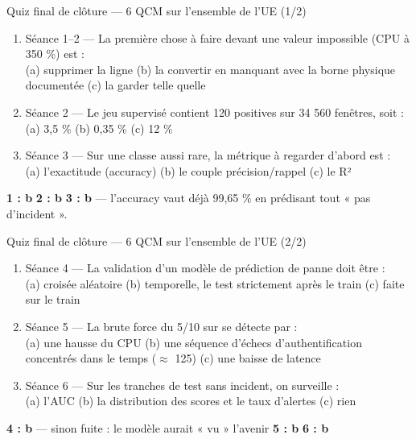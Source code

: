 \begin{frame}{Quiz final de clôture --- 6 QCM sur l'ensemble de l'UE (1/2)}
\begin{qbox}[Questions 1 à 3]
\begin{enumerate}
\item Séance 1--2 --- La première chose à faire devant une valeur
impossible (CPU à 350 \%) est :\\
(a) supprimer la ligne \quad (b) la convertir en manquant avec la borne
physique documentée \quad (c) la garder telle quelle
\item Séance 2 --- Le jeu supervisé contient 120 positives sur 34 560
fenêtres, soit :\\
(a) 3,5 \% \quad (b) 0,35 \% \quad (c) 12 \%
\item Séance 3 --- Sur une classe aussi rare, la métrique à regarder
d'abord est :\\
(a) l'exactitude (accuracy) \quad (b) le couple précision/rappel \quad
(c) le R²
\end{enumerate}
\end{qbox}
\vspace{1mm}
\begin{solbox}[Réponses]
\textbf{1 : b} \quad \textbf{2 : b} \quad \textbf{3 : b} --- l'accuracy
vaut déjà 99,65 \% en prédisant tout « pas d'incident ».
\end{solbox}
\end{frame}

\begin{frame}{Quiz final de clôture --- 6 QCM sur l'ensemble de l'UE (2/2)}
\begin{qbox}[Questions 4 à 6]
\begin{enumerate}
\item Séance 4 --- La validation d'un modèle de prédiction de panne doit
être :\\
(a) croisée aléatoire \quad (b) temporelle, le test strictement après le
train \quad (c) faite sur le train
\item Séance 5 --- La brute force du 5/10 sur  se
détecte par :\\
(a) une hausse du CPU \quad (b) une séquence d'échecs d'authentification
concentrés dans le temps ($\approx$ 125) \quad (c) une baisse de latence
\item Séance 6 --- Sur les tranches de test sans incident, on surveille :\\
(a) l'AUC \quad (b) la distribution des scores et le taux d'alertes \quad
(c) rien
\end{enumerate}
\end{qbox}
\vspace{1mm}
\begin{solbox}[Réponses]
\textbf{4 : b} --- sinon fuite : le modèle aurait « vu » l'avenir \quad
\textbf{5 : b} \quad \textbf{6 : b}
\end{solbox}
\end{frame}

